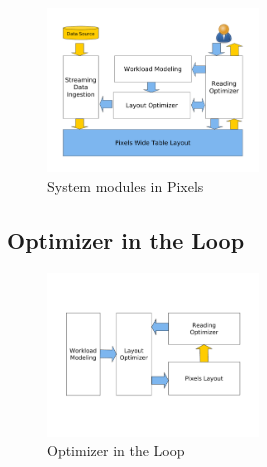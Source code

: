 \begin{figure}[h!]
	\vspace{-1em}
	\centering
	\includegraphics[width=0.5\textwidth, height=0.36\textwidth]{figs/overview}
	\vspace{-3em}
	\caption{System modules in Pixels}\label{fig:overview}
	\vspace{-0em}
\end{figure}

\subsection{Optimizer in the Loop}
\label{subsec:optimizer-in-the-loop}

\begin{figure}[h!]
	\vspace{-3em}
	\centering
	\includegraphics[width=0.5\textwidth, height=0.36\textwidth]{figs/loop}
	\vspace{-6em}
	\caption{Optimizer in the Loop}\label{fig:loop}
	\vspace{-0em}
\end{figure}

